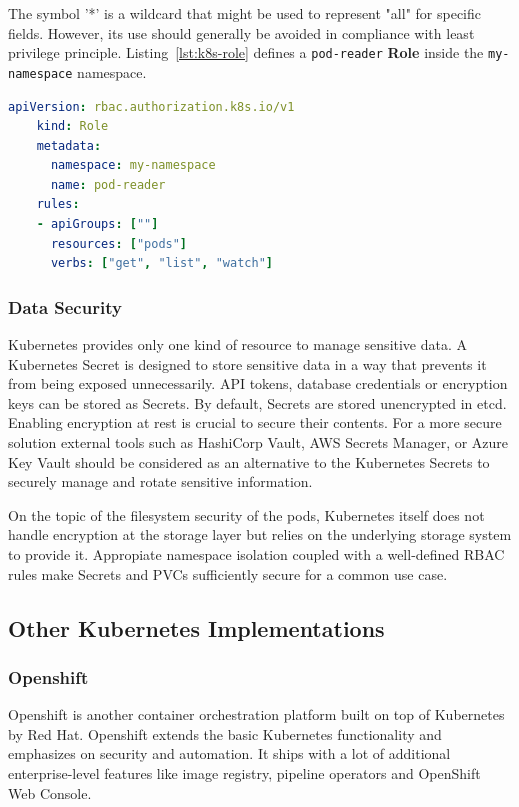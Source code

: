 The symbol '*' is a wildcard that might be used to represent "all" for specific fields. However, its use should generally be avoided in compliance with least privilege principle.
Listing~\ref{lst:k8s-role} defines a \lstinline{pod-reader} \textbf{Role} inside the \lstinline{my-namespace} namespace.

\begin{lstlisting}[language=YAML, caption={An example of a Kubernetes Role definition.}, label={lst:k8s-role}]
    apiVersion: rbac.authorization.k8s.io/v1
    kind: Role
    metadata:
      namespace: my-namespace
      name: pod-reader
    rules:
    - apiGroups: [""]
      resources: ["pods"]
      verbs: ["get", "list", "watch"]
\end{lstlisting}

\subsubsection*{Data Security}

Kubernetes provides only one kind of resource to manage sensitive data. A Kubernetes Secret is designed to store sensitive data in a way that prevents it from being exposed unnecessarily. API tokens, database credentials or encryption keys can be stored as Secrets. By default, Secrets are stored unencrypted in etcd. Enabling encryption at rest is crucial to secure their contents. For a more secure solution external tools such as HashiCorp Vault, AWS Secrets Manager, or Azure Key Vault should be considered as an alternative to the Kubernetes Secrets to securely manage and rotate sensitive information.

On the topic of the filesystem security of the pods, Kubernetes itself does not handle encryption at the storage layer but relies on the underlying storage system to provide it. Appropiate namespace isolation coupled with a well-defined RBAC rules make Secrets and PVCs sufficiently secure for a common use case.

\subsection{Other Kubernetes Implementations}
\label{sec:other-kubernetes-implementations}

\subsubsection*{Openshift}

Openshift is another container orchestration platform built on top of Kubernetes by Red Hat. Openshift extends the basic Kubernetes functionality and emphasizes on security and automation. It ships with a lot of additional enterprise-level features like image registry, pipeline operators and OpenShift Web Console.

